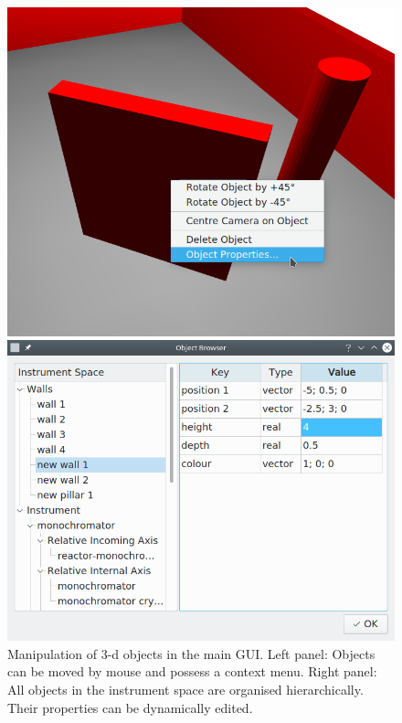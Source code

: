 \begin{figure}[htb]
	\begin{minipage}{0.45 \textwidth}
		\begin{center}
			\includegraphics[width = 1 \textwidth]{figures/gui_object}
		\end{center}
	\end{minipage}
	\hspace{0.1cm}
	\begin{minipage}{0.5 \textwidth}
		\begin{center}
			\includegraphics[width = 1 \textwidth]{figures/gui_objbrowser}
		\end{center}
	\end{minipage}
	\caption[Object manipulation.]{Manipulation of 3-d objects in the main GUI.
		Left panel: Objects can be moved by mouse and possess a context menu.
		Right panel: All objects in the instrument space are organised hierarchically. 
			Their properties can be dynamically edited.
		\label{fig:gui_objects}}
\end{figure}



